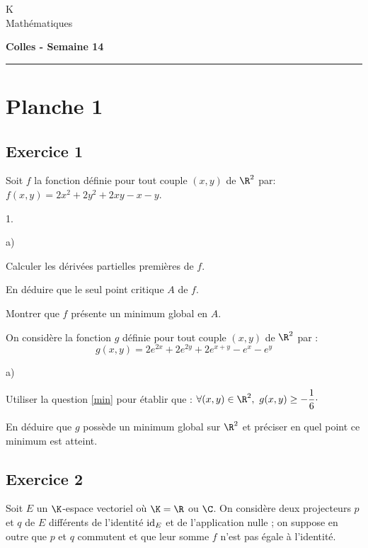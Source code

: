 \documentclass[11pt]{article}%
\begin{document}
\begin{flushleft}
K \\
Mathématiques
\end{flushleft}

\begin{center}
\textbf{\Large{Colles - Semaine 14}}
\end{center}

\hrule

\vspace*{0,2cm}

\section*{Planche 1} 

\subsection*{Exercice 1}
\noindent
Soit $f$ la fonction définie pour tout couple $(x,y)$ de $\R^{2}$
par: $f(x,y) = 2 x^{2} +2 y^{2}+ 2xy - x - y$.
\begin{noliste}{1.}
\item
\begin{noliste}{a)}
\item 
Calculer les dérivées partielles premières de $f$.
\item  
En déduire que le seul point critique $A$ de $f$.%
\end{noliste}
\item\label{min}
Montrer que $f$ présente un minimum global en $A$.
\item 
On considère la fonction $g$ définie pour tout couple $(x,y)$ de 
$\R^{2}$ par :
\[
 g(x,y) = 2 e^{2x} + 2 e^{2y} + 2 e^{x+y} - e^{x}- e^{y}
\]
\begin{noliste}{a)}
\item 
Utiliser la question \ref{min} pour établir que : \quad $\forall(x,y)\in 
\R^{2},\ g(x,y) \ge -\dfrac{1}{6}\cdotp$
\item 
En déduire que $g$ possède un minimum global sur $\R^{2}$ et préciser en 
quel point ce minimum est atteint.
\end{noliste}
\end{noliste}

\subsection*{Exercice 2} %
\noindent
Soit $E$ un $\K$-espace vectoriel où $\K=\R$ ou $\C$. On
considère deux projecteurs $p$ et $q$ de $E$ différents de
l'identité ${\rm{id}}_E$ et de l'application nulle ; on suppose en outre
que $p$ et $q$ commutent et que leur somme $f$ n'est pas égale
à l'identité.
\end{document}
